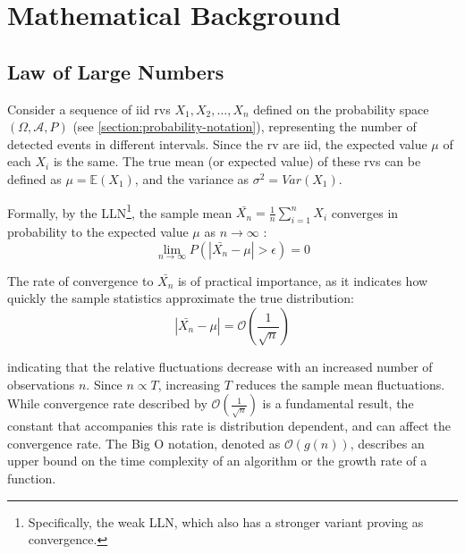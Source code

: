 \chapter{Mathematical Background}
\label{appendix:mathematical-notation}

\section{Law of Large Numbers}\label{section:law-of-large-numbers}
Consider a sequence of \gls{iid} \glspl{rv} $X_1, X_2, \dots, X_n$ defined on the probability space $(\Omega, \mathcal{A}, P)$ (see \cref{section:probability-notation}), representing the number of detected events in different intervals. Since the \gls{rv} are \gls{iid}, the expected value $\mu$ of each $X_i$ is the same. The true mean (or expected value) of these \glspl{rv} can be defined as $\mu = \mathbb{E}(X_1)$, and the variance as $\sigma^2 = Var(X_1)$.

Formally, by the \gls{LLN}\footnote{Specifically, the weak \gls{LLN}, which also has a stronger variant proving \gls{as} convergence.}, the sample mean $\bar{X_n} = \frac{1}{n} \sum_{i=1}^{n} X_i$ converges in probability to the expected value $\mu$ as $n \to \infty$ \cite{fellerIntroductionProbabilityTheory1968}:
\begin{equation}
    \lim_{n \to \infty} P(|\bar{X_n} - \mu| > \epsilon) = 0
\end{equation}

The rate of convergence to $\bar{X_n}$ is of practical importance, as it indicates how quickly the sample statistics approximate the true distribution:
\begin{equation}
    \left|\bar{X_n} - \mu\right| = \mathcal{O}\left(\frac{1}{\sqrt{n}}\right)
\end{equation}

indicating that the relative fluctuations decrease with an increased number of observations $n$.  Since $n \propto T$, increasing $T$ reduces the sample mean fluctuations. While convergence rate described by $\mathcal{O}\left(\frac{1}{\sqrt{n}}\right)$ is a fundamental result, the constant that accompanies this rate is distribution dependent, and can affect the convergence rate. The Big O notation, denoted as $\mathcal{O}(g(n))$, describes an upper bound on the time complexity of an algorithm or the growth rate of a function.

